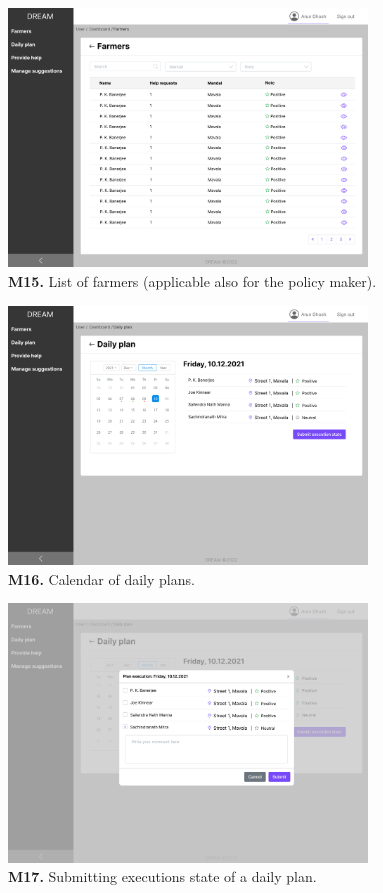 \begin{figure}[H]
    \centering
    \includegraphics[width=0.85\textwidth]{mockups/Agronomist_Dashboard_Farmers.png}
    \caption{\textbf{M15.} List of farmers (applicable also for the policy maker).}
\end{figure}

\begin{figure}[H]
    \centering
    \includegraphics[width=0.85\textwidth]{mockups/Agronomist_Dashboard_Visit plan.png}
    \caption{\textbf{M16.} Calendar of daily plans.}
\end{figure}

\begin{figure}[H]
    \centering
    \includegraphics[width=0.85\textwidth]{mockups/Agronomist_Dashboard_Visit plan_Submit.png}
    \caption{\textbf{M17.} Submitting executions state of a daily plan.}
\end{figure}

